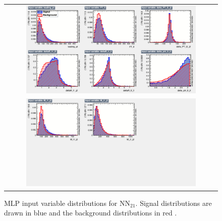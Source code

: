\begin{figure}[ht]
  \begin{center}
    \begin{tabular}{c}
      \includegraphics[width=0.82\textwidth]{figures/tW/fig/MVA/MLP_2j1b/var_1.png}\\
      \includegraphics[width=0.82\textwidth]{figures/tW/fig/MVA/MLP_2j1b/var_2.png}\\
    \end{tabular}
    \caption{MLP input variable distributions for NN$_{21}$. Signal distributions are drawn in blue and the background distributions in red \cite{CMS-AN-2017-132}.}
    \label{fig:input_var_2j1b}
  \end{center}
\end{figure}

